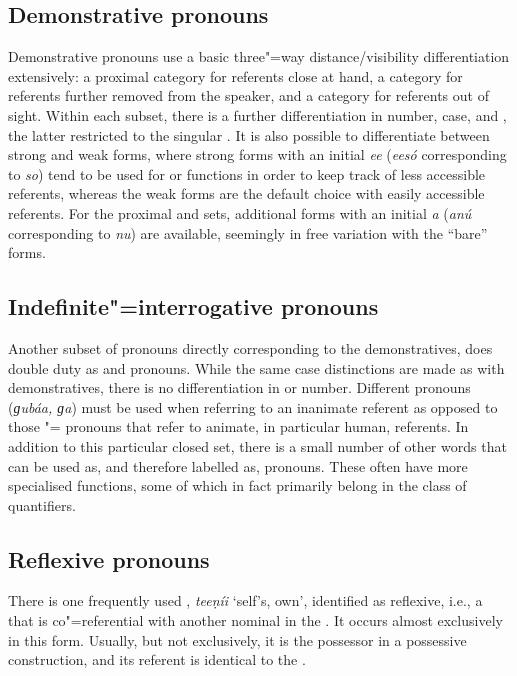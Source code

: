 \subsection{Demonstrative pronouns}
\label{subsec:3b-6-2}
Demonstrative pronouns use a basic three"=way distance/visibility differentiation extensively: a proximal category for referents close at hand, a  category for referents further removed from the speaker, and a  category for referents out of sight. Within each subset, there is a further differentiation in number, case, and , the latter restricted to the singular . It is also possible to differentiate between strong and weak forms, where strong forms with an initial \textit{ee} (\textit{eesó} corresponding to \textit{so}) tend to be used for  or  functions in order to keep track of less accessible  referents, whereas the weak forms are the default choice with easily accessible  referents. For the proximal and  sets, additional forms with an initial \textit{a} (\textit{anú} corresponding to \textit{nu}) are available, seemingly in free variation with the ``bare'' forms.


\subsection{Indefinite"={interrogative} pronouns}
\label{subsec:3b-6-3}
Another subset of pronouns directly corresponding to the demonstratives, does double duty as  and  pronouns. While the same case distinctions are made as with demonstratives, there is no differentiation in  or number. Different  pronouns (\textit{ɡubáa, ɡa}) must be used when referring to an inanimate referent as opposed to those "= pronouns that refer to animate, in particular human, referents. In addition to this particular closed set, there is a small number of other words that can be used as, and therefore labelled as,  pronouns. These often have more specialised functions, some of which in fact primarily belong in the class of quantifiers.


\subsection{Reflexive pronouns}
\label{subsec:3b-6-4}
There is one frequently used , \textit{teeṇíi} `self’s, own', identified as reflexive, i.e., a  that is co"=referential with another nominal in the . It occurs almost exclusively in this form. Usually, but not exclusively, it is the possessor in a possessive construction, and its referent is identical to the  .


